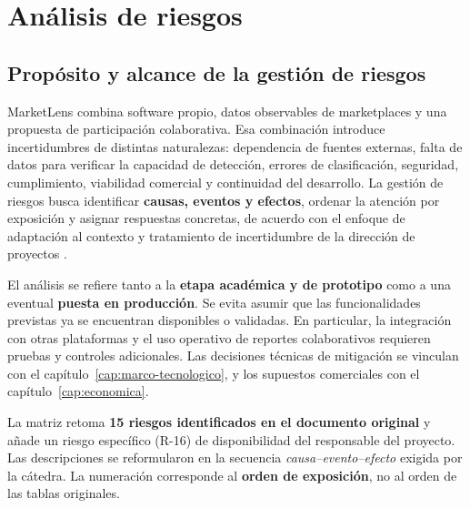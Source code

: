 
\chapter{Análisis de riesgos}\label{cap:riesgos}

\section{Propósito y alcance de la gestión de riesgos}\label{sec:ml-riesgos-alcance}

MarketLens combina software propio, datos observables de marketplaces y una propuesta de participación colaborativa. Esa combinación introduce incertidumbres de distintas naturalezas: dependencia de fuentes externas, falta de datos para verificar la capacidad de detección, errores de clasificación, seguridad, cumplimiento, viabilidad comercial y continuidad del desarrollo. La gestión de riesgos busca identificar \textbf{causas, eventos y efectos}, ordenar la atención por exposición y asignar respuestas concretas, de acuerdo con el enfoque de adaptación al contexto y tratamiento de incertidumbre de la dirección de proyectos \parencite{ml-pmi-2021}.

El análisis se refiere tanto a la \textbf{etapa académica y de prototipo} como a una eventual \textbf{puesta en producción}. Se evita asumir que las funcionalidades previstas ya se encuentran disponibles o validadas. En particular, la integración con otras plataformas y el uso operativo de reportes colaborativos requieren pruebas y controles adicionales. Las decisiones técnicas de mitigación se vinculan con el capítulo~\ref{cap:marco-tecnologico}, y los supuestos comerciales con el capítulo~\ref{cap:economica}.

La matriz retoma \textbf{15 riesgos identificados en el documento original} y añade un riesgo específico (R-16) de disponibilidad del responsable del proyecto. Las descripciones se reformularon en la secuencia \emph{causa--evento--efecto} exigida por la cátedra. La numeración corresponde al \textbf{orden de exposición}, no al orden de las tablas originales.

